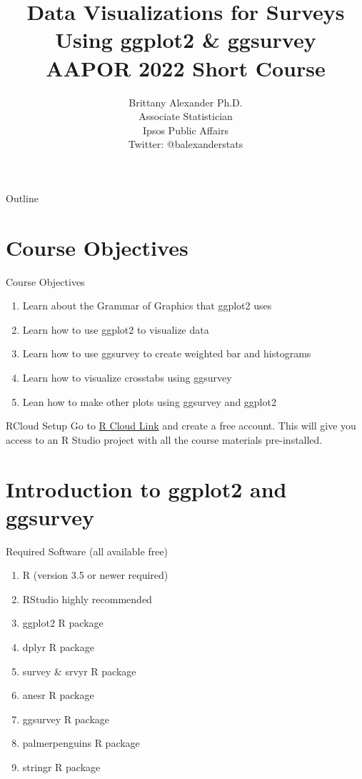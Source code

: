 \documentclass{beamer}\usepackage[]{graphicx}\usepackage[]{xcolor}
\title{Data Visualizations for Surveys Using ggplot2 \& ggsurvey \\
AAPOR 2022 Short Course}
\author{Brittany Alexander Ph.D. \\
Associate Statistician \\
Ipsos Public Affairs \\
Twitter: @balexanderstats}
\begin{document}
\begin{frame}
\titlepage
\end{frame}
\begin{frame}{Outline}
\tableofcontents
\end{frame}
\section{Course Objectives}
\begin{frame}{Course Objectives}
\begin{enumerate}
\item Learn about the Grammar of Graphics that ggplot2 uses
\item Learn how to use ggplot2 to visualize data
\item Learn how to use ggsurvey to create weighted bar and histograms
\item Learn how to visualize crosstabs using ggsurvey
\item Lean how to make other plots using ggsurvey and ggplot2
\end{enumerate}
\end{frame}

\begin{frame}{RCloud Setup}
Go to \href{https://rstudio.cloud/project/3797940}{R Cloud Link} and create a free account. This will give you access to an R Studio project with all the course materials pre-installed.
\end{frame}

\section{Introduction to ggplot2 and ggsurvey}
\begin{frame}{Required Software (all available free)}
\begin{enumerate}
\item R (version 3.5 or newer required)
\item RStudio highly recommended
\item ggplot2 R package
\item dplyr R package
\item survey \& srvyr R package
\item anesr R package
\item ggsurvey R package
\item palmerpenguins R package
\item stringr R package
\end{enumerate}
\end{frame}
\end{document}

